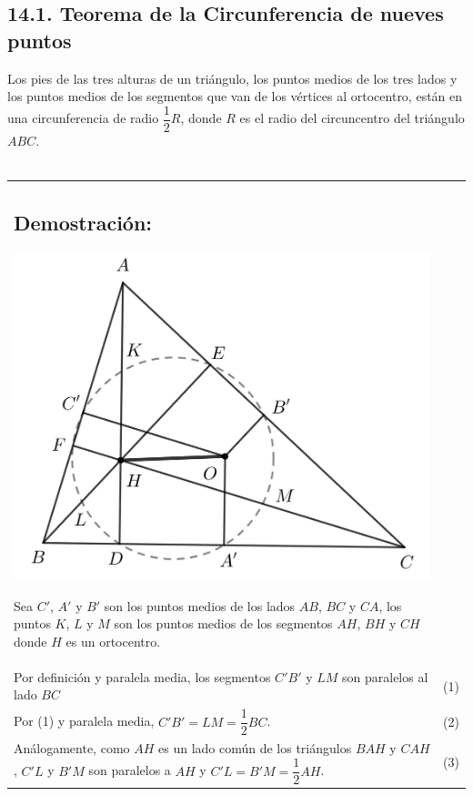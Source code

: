 \documentclass[12pt,a4paper]{article}
\begin{document}
\subsection*{14.1. Teorema de la Circunferencia de nueves puntos}
Los pies de las tres alturas de un triángulo, los puntos medios de los tres lados y los puntos medios de los segmentos que van de los vértices al ortocentro, están en una circunferencia de radio $\dfrac{1}{2}R$, donde $R$ es el radio del circuncentro del triángulo $ABC$.\\\\
\begin{tabular}{p{15.9 cm} p{1cm}}
\subsection*{Demostración:}
\begin{center}
\includegraphics[scale=0.7]{Imagenes/circunferencia nueve.png} 
\end{center}
Sea $C'$, $A'$ y $B'$ son los puntos medios de los lados $AB$, $BC$ y $CA$, los puntos $K$, $L$ y $M$ son los puntos medios de los segmentos $AH$, $BH$ y $CH$ donde $H$ es un ortocentro. 
\\Por definición y paralela media, los segmentos $C'B'$ y $LM$ son paralelos al lado $BC$ &(1)
\\Por (1) y paralela media, $C'B'=LM=\dfrac{1}{2} BC$. &(2)
\\Análogamente, como $AH$ es un lado común de los triángulos $BAH$ y $CAH$, $C'L$ y $B'M$ son paralelos a $AH$ y $C'L=B'M=\dfrac{1}{2} AH$. &\medskip (3)

\end{tabular}
\end{document}
